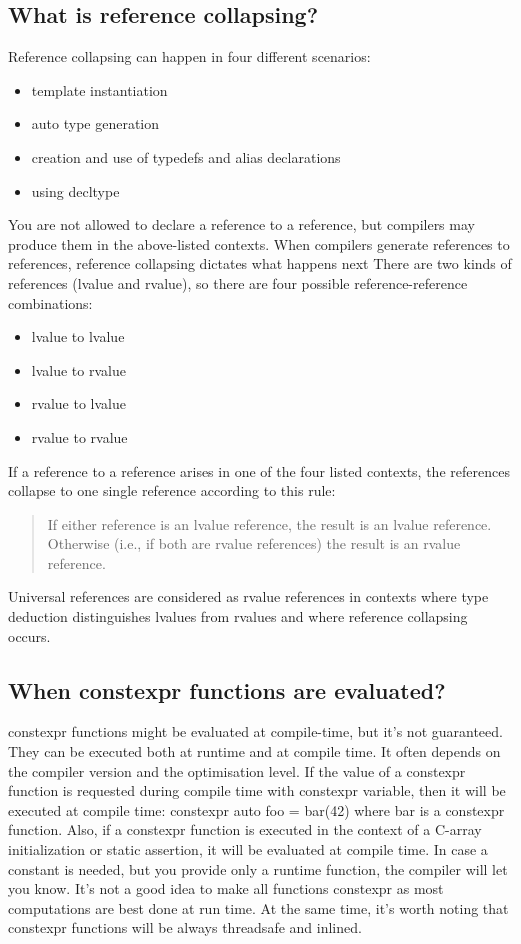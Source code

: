 \documentclass{report}
\begin{document}
\subsection{What is reference collapsing?}
\bigbreak \noindent 
Reference collapsing can happen in four different scenarios:
\begin{itemize}
    \item template instantiation
    \item auto type generation
    \item creation and use of typedefs and alias declarations
    \item using decltype
\end{itemize}
\bigbreak \noindent 
You are not allowed to declare a reference to a reference, but
compilers may produce them in the above-listed contexts. When
compilers generate references to references, reference collapsing
dictates what happens next
\bigbreak \noindent 
There are two kinds of references (lvalue and rvalue), so there are
four possible reference-reference combinations:
\begin{itemize}
    \item lvalue to lvalue
    \item lvalue to rvalue
    \item rvalue to lvalue
    \item rvalue to rvalue
\end{itemize}
\bigbreak \noindent 
If a reference to a reference arises in one of the four listed contexts,
the references collapse to one single reference according to this rule:
\bigbreak \noindent 
\begin{quote}
    If either reference is an lvalue reference, the result is an lvalue reference. Otherwise (i.e., if both are rvalue references) the result is an rvalue reference.
\end{quote}
\bigbreak \noindent 
Universal references are considered as rvalue references in contexts
where type deduction distinguishes lvalues from rvalues and where
reference collapsing occurs.

\bigbreak \noindent 
\subsection{When constexpr functions are evaluated?}
\bigbreak \noindent 
constexpr functions might be evaluated at compile-time, but it’s
not guaranteed. They can be executed both at runtime and at
compile time. It often depends on the compiler version and the
optimisation level.
\bigbreak \noindent 
If the value of a constexpr function is requested during compile
time with constexpr variable, then it will be executed at compile
time: constexpr auto foo = bar(42) where bar is a constexpr
function.
\bigbreak \noindent 
Also, if a constexpr function is executed in the context of a C-array
initialization or static assertion, it will be evaluated at compile time.
\bigbreak \noindent 
In case a constant is needed, but you provide only a runtime
function, the compiler will let you know.
\bigbreak \noindent 
It’s not a good idea to make all functions constexpr as most
computations are best done at run time. At the same time, it’s
worth noting that constexpr functions will be always threadsafe
and inlined.
\end{document}
